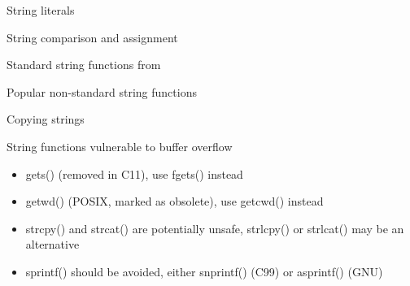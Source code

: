 \begin{frame}{String literals}
\end{frame}
\begin{frame}{String comparison and assignment}
    
\end{frame}
\begin{frame}{Standard string functions from }
    
\end{frame}
\begin{frame}{Popular non-standard string functions}
    
\end{frame}
\begin{frame}{Copying strings}
    \only<1>{ Bad: 
    }
    \only<2>{ Bad: 
    }
\end{frame}
\begin{frame}{String functions vulnerable to buffer overflow}
    \begin{itemize}
        \item gets() (removed in C11), use fgets() instead
        \item getwd() (POSIX, marked as obsolete), use getcwd() instead
        \item strcpy() and strcat() are potentially unsafe, strlcpy() or strlcat() may be an alternative
        \item sprintf() should be avoided, either snprintf() (C99) or asprintf() (GNU)
    \end{itemize}
\end{frame}


